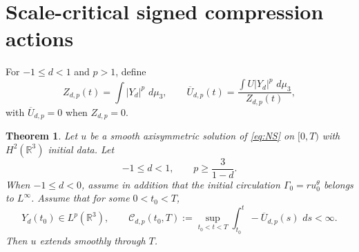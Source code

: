 \documentclass[11pt]{article}
\numberwithin{equation}{section}
\newtheorem{theorem}{Theorem}[section]
\theoremstyle{definition}
\newcommand{\R}{\mathbb R}
\newcommand{\dd}{\,d}
\begin{document}
\section{Scale-critical signed compression actions}

For $-1\le d<1$ and $p>1$, define
\begin{equation}\label{eq:Zdp-Udp}
 Z_{d,p}(t)=\int |Y_d|^p\,\dd\mu_3,
 \qquad
 \overline U_{d,p}(t)
 =\frac{\int U|Y_d|^p\,\dd\mu_3}{Z_{d,p}(t)},
\end{equation}
with $\overline U_{d,p}=0$ when $Z_{d,p}=0$.

\begin{theorem}\label{thm:two-parameter-action}
Let $u$ be a smooth axisymmetric solution of \eqref{eq:NS} on $[0,T)$ with $H^2(\R^3)$ initial data.  Let
\[
 -1\le d<1,
 \qquad
 p\ge\frac3{1-d}.
\]
When $-1\le d<0$, assume in addition that the initial circulation $\Gamma_0=ru_0^\theta$ belongs to $L^\infty$.
Assume that for some $0<t_0<T$,
\begin{equation}\label{eq:action-dp-hyp}
 Y_d(t_0)\in L^p(\R^3),
 \qquad
 \mathcal C_{d,p}(t_0,T)
 :=\sup_{t_0<t<T}\int_{t_0}^t-\overline U_{d,p}(s)\,\dd s<\infty.
\end{equation}
Then $u$ extends smoothly through $T$.
\end{theorem}
\end{document}

